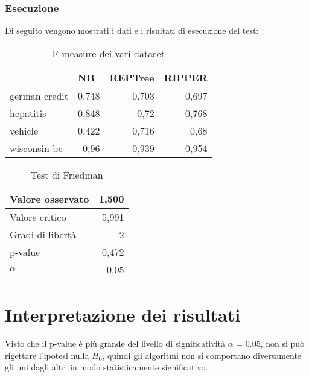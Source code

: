 \subsubsection*{Esecuzione}
Di seguito vengono mostrati i dati e i risultati di esecuzione del test:

\begin{table}[!htbp]
	\centering
	\begin{tabular}{|l|r|r|r|}
		\hline
		& \multicolumn{1}{l|}{NB} & \multicolumn{1}{l|}{REPTree} & \multicolumn{1}{l|}{RIPPER} \\ \hline
		german credit & 0,748 & 0,703 & 0,697 \\ \hline
		hepatitis & 0,848 & 0,72 & 0,768 \\ \hline
		vehicle & 0,422 & 0,716 & 0,68 \\ \hline
		wisconsin bc & 0,96 & 0,939 & 0,954 \\ \hline
	\end{tabular}
	\caption{F-measure dei vari dataset}
	\label{}
\end{table}

\begin{table}[!htbp]
	\centering
	\begin{tabular}{|l|r|}
		\hline
		Valore osservato & 1,500 \\ \hline
		Valore critico & 5,991 \\ \hline
		Gradi di libertà & 2 \\ \hline
		p-value & 0,472 \\ \hline
		$\alpha$ & 0,05 \\ \hline
	\end{tabular}
	\caption{Test di Friedman}
\end{table}

\clearpage

\section{Interpretazione dei risultati}

Visto che il p-value è più grande del livello di significatività $\alpha$ = 0.05, non si può rigettare l'ipotesi nulla $H_0$, quindi gli algoritmi non si comportano diversamente gli uni dagli altri in modo statisticamente significativo.
